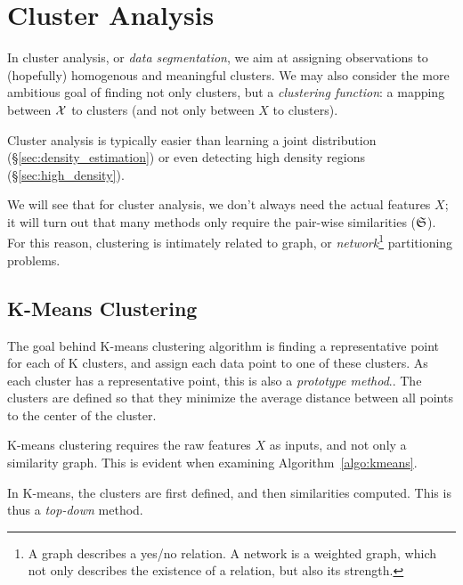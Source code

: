 \begin{remark}
\end{remark}



\section{Cluster Analysis}
\label{sec:cluster_analysis}

In cluster analysis, or \emph{data segmentation}, we aim at assigning observations to (hopefully) homogenous and meaningful clusters. 
We may also consider the more ambitious goal of finding not only clusters, but a \emph{clustering function}: a mapping between $\mathcal{X}$ to clusters (and not only between $X$ to clusters).

Cluster analysis is typically easier than learning a joint distribution (\S\ref{sec:density_estimation}) or even detecting high density regions (\S\ref{sec:high_density}). 

We will see that for cluster analysis, we don't always need the actual features $X$; it will turn out that many methods only require the pair-wise similarities ($\mathfrak{S}$). 
For this reason, clustering is intimately related to graph, or \emph{network}\footnote{A graph describes a yes/no relation. A network is a weighted graph, which not only describes the existence of a relation, but also its strength.} partitioning problems.



\subsection{K-Means Clustering}
\label{sec:kmeans}



The goal behind K-means clustering algorithm is finding a representative point for each of K clusters, and assign each data point to one of these clusters. 
As each cluster has a representative point, this is also a \emph{prototype method}..
The clusters are defined so that they minimize the average distance between all points to the center of the cluster.

K-means clustering requires the raw features $X$ as inputs, and not only a similarity graph. 
This is evident when examining Algorithm~\ref{algo:kmeans}.

In K-means, the clusters are first defined, and then similarities computed. This is thus a \emph{top-down} method.

